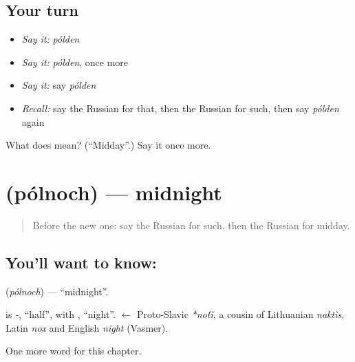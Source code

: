 \subsection*{Your turn}
\begin{itemize}
\raggedright
  \item \emph{Say it:} \emph{pólden}
  \item \emph{Say it:} \emph{pólden}, once more
  \item \emph{Say it:} say \emph{pólden}
  \item \emph{Recall:} say the Russian for that, then the Russian for such, then say \emph{pólden} again
\end{itemize}

\begin{tcolorbox}[breakable,colback=teal!4,colframe=teal!35!black,title={Before you move on}]
What does  mean? (\textquotedblleft{}Midday\textquotedblright{}.) Say it once more.
\end{tcolorbox}
\section[\texorpdfstring{\ru{полночь} (pólnoch)}{полночь (pólnoch)}]{ (pólnoch) — midnight}

\label{lesson:RU-C83-midnight}



\begin{quote}
Before the new one: say the Russian for such, then the Russian for midday.
\end{quote}

\subsection*{You'll want to know: }
\textbf{} (\emph{pólnoch}) — \textquotedblleft{}midnight\textquotedblright{}.

\begin{cousinweb}
\textbf{} is \emph{-}, \textquotedblleft{}half\textquotedblright{}, with \emph{}, \textquotedblleft{}night\textquotedblright{}. \emph{} $\leftarrow$ Proto-Slavic \emph{*noťĭ}, a cousin of Lithuanian \emph{naktìs}, Latin \emph{nox} and English \emph{night} (Vasmer).
\end{cousinweb}

\begin{grammarlens}[title={What you've built}]
One more word for this chapter.
\end{grammarlens}

